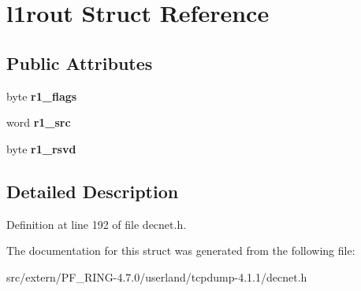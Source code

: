 \hypertarget{structl1rout}{
\section{l1rout Struct Reference}
\label{structl1rout}
}
\subsection*{Public Attributes}
\begin{DoxyCompactItemize}
\item 
\hypertarget{structl1rout_ac4c3ebb05e85d90a591547c5b8518cb5}{
byte {\bfseries r1\_\-flags}}
\label{structl1rout_ac4c3ebb05e85d90a591547c5b8518cb5}

\item 
\hypertarget{structl1rout_aa9ee60c89a653410fd6b631acd78056d}{
word {\bfseries r1\_\-src}}
\label{structl1rout_aa9ee60c89a653410fd6b631acd78056d}

\item 
\hypertarget{structl1rout_a2a5eb24afc1e6855d715539e7b991e2b}{
byte {\bfseries r1\_\-rsvd}}
\label{structl1rout_a2a5eb24afc1e6855d715539e7b991e2b}

\end{DoxyCompactItemize}


\subsection{Detailed Description}


Definition at line 192 of file decnet.h.



The documentation for this struct was generated from the following file:\begin{DoxyCompactItemize}
\item 
src/extern/PF\_\-RING-\/4.7.0/userland/tcpdump-\/4.1.1/decnet.h\end{DoxyCompactItemize}
